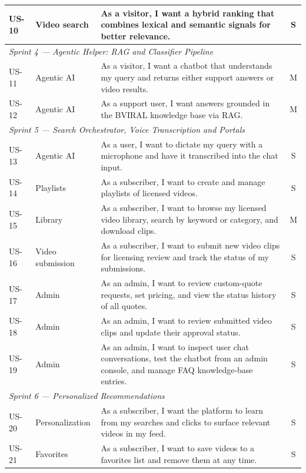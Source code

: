 \begin{longtable}{@{}llp{}c@{}}
US-10 & Video search    & As a visitor, I want a hybrid ranking that combines lexical and
  semantic signals for better relevance. & S \\
\midrule
\multicolumn{4}{l}{\textit{Sprint 4 — Agentic Helper: RAG and Classifier Pipeline}} \\
\midrule
US-11 & Agentic AI      & As a visitor, I want a chatbot that understands my query and returns
  either support answers or video results. & M \\
US-12 & Agentic AI      & As a support user, I want answers grounded in the BVIRAL knowledge
  base via RAG. & M \\
\midrule
\multicolumn{4}{l}{\textit{Sprint 5 — Search Orchestrator, Voice Transcription and Portals}} \\
\midrule
US-13 & Agentic AI      & As a user, I want to dictate my query with a microphone and have it
  transcribed into the chat input. & S \\
US-14 & Playlists       & As a subscriber, I want to create and manage playlists of licensed
  videos. & S \\
US-15 & Library         & As a subscriber, I want to browse my licensed video library, search
  by keyword or category, and download clips. & M \\
US-16 & Video submission & As a subscriber, I want to submit new video clips for licensing review
  and track the status of my submissions. & S \\
US-17 & Admin           & As an admin, I want to review custom-quote requests, set pricing, and
  view the status history of all quotes. & S \\
US-18 & Admin           & As an admin, I want to review submitted video clips and update their
  approval status. & S \\
US-19 & Admin           & As an admin, I want to inspect user chat conversations, test the
  chatbot from an admin console, and manage FAQ knowledge-base entries. & S \\
\midrule
\multicolumn{4}{l}{\textit{Sprint 6 — Personalized Recommendations}} \\
\midrule
US-20 & Personalization & As a subscriber, I want the platform to learn from my searches and
  clicks to surface relevant videos in my feed. & S \\
US-21 & Favorites       & As a subscriber, I want to save videos to a favorites list and remove
  them at any time. & S \\
\end{longtable}
\normalsize

